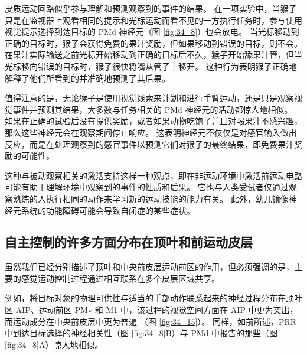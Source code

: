 皮质运动回路似乎参与理解和预测观察到的事件的结果。 在一项实验中，当猴子只是在监视器上观看相同的提示和光标运动而看不见的一方执行任务时，参与使用视觉提示选择到达目标的 PMd 神经元（图 \ref{fig:34_8}）也会放电。 当光标移动到正确的目标时，猴子会获得免费的果汁奖励，但如果移动到错误的目标，则不会。 在果汁实际输送之前光标开始移动到正确的目标后不久，猴子开始舔果汁管，但当光标移向错误的目标时，猴子很快将嘴从管子上移开。 这种行为表明猴子正确地解释了他们所看到的并准确地预测了其后果。

值得注意的是，无论猴子是使用视觉线索来计划和进行手臂运动，还是只是观察视觉事件并预测其结果，大多数与任务相关的 PMd 神经元的活动都惊人地相似。 如果在正确的试验后没有提供奖励，或者如果动物吃饱了并且对喝果汁不感兴趣，那么这些神经元会在观察期间停止响应。 这表明神经元不仅仅是对感官输入做出反应，而是在处理观察到的感官事件以预测它们对猴子的最终结果，即免费果汁奖励的可能性。

这种与被动观察相关的激活支持这样一种观点，即在非运动环境中激活前运动电路可能有助于理解环境中观察到的事件的性质和后果。 它也与人类受试者仅通过观察熟练的人执行相同的动作来学习新的运动技能的能力有关。 此外，幼儿镜像神经元系统的功能障碍可能会导致自闭症的某些症状。

\subsection{自主控制的许多方面分布在顶叶和前运动皮层}
虽然我们已经分别描述了顶叶和中央前皮层运动前区的作用，但必须强调的是，主要的感觉运动控制过程通过相互联系在多个皮层区域共享。

例如，将目标对象的物理可供性与适当的手部动作联系起来的神经过程分布在顶叶区 AIP、运动前区 PMv 和 M1 中，该过程的视觉空间方面在 AIP 中更为突出，而运动成分在中央前皮层中更为普遍 （图 \ref{fig:34_15}）。 
同样，如前所述，PRR 中到达目标选择的神经相关性（图 \ref{fig:34_8}B）与 PMd 中报告的那些（图 \ref{fig:34_8}A）惊人地相似。

